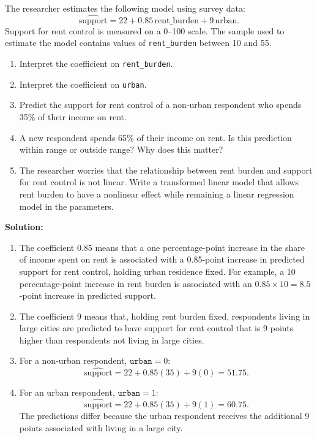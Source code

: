 \documentclass[12pt]{article}
\newif\ifsolutions
\begin{document}
\begin{enumerate}
    The researcher estimates the following model using survey data:
    \[
        \widehat{\text{support}}
        = 22 + 0.85\,\text{rent\_burden} + 9\,\text{urban}.
    \]
    Support for rent control is measured on a 0--100 scale. The sample used to estimate the model contains values of \texttt{rent\_burden} between 10 and 55.
    
    \begin{enumerate}[label=(\alph*)]
        \item Interpret the coefficient on \texttt{rent\_burden}.
        \item Interpret the coefficient on \texttt{urban}.
        \item Predict the support for rent control of a non-urban respondent who spends 35\% of their income on rent.
        \item A new respondent spends 65\% of their income on rent. Is this prediction within range or outside range? Why does this matter?
        \item The researcher worries that the relationship between rent burden and support for rent control is not linear. Write a transformed linear model that allows rent burden to have a nonlinear effect while remaining a linear regression model in the parameters.
    \end{enumerate}
    
    \ifsolutions \color{blue} \textbf{Solution:} \\
    \begin{enumerate}[label=(\alph*)]
        \item The coefficient 0.85 means that a one percentage-point increase in the share of income spent on rent is associated with a 0.85-point increase in predicted support for rent control, holding urban residence fixed. For example, a 10 percentage-point increase in rent burden is associated with an \(0.85 \times 10 = 8.5\)-point increase in predicted support.
        
        \item The coefficient 9 means that, holding rent burden fixed, respondents living in large cities are predicted to have support for rent control that is 9 points higher than respondents not living in large cities.
        
        \item For a non-urban respondent, \(\texttt{urban}=0\):
        \[
            \widehat{\text{support}} = 22 + 0.85(35) + 9(0) = 51.75.
        \]
        
        \item For an urban respondent, \(\texttt{urban}=1\):
        \[
            \widehat{\text{support}} = 22 + 0.85(35) + 9(1) = 60.75.
        \]
        The predictions differ because the urban respondent receives the additional 9 points associated with living in a large city.
        

\end{enumerate}
\end{enumerate}
\end{document}
